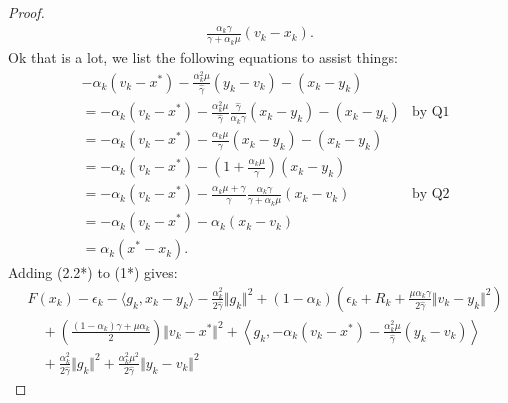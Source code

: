 \documentclass[12pt]{article}
\begin{document}
\begin{proof}
\begin{align*}
            \frac{\alpha_k \gamma}{\gamma + \alpha_k \mu}(v_k - x_k). 
        \end{align*}
        Ok that is a lot, we list the following equations to assist things: 
        \begin{align*}
            &  
            - \alpha_k(v_k - x^*) - \frac{\alpha_k^2 \mu}{\hat \gamma}(y_k - v_k) - (x_k - y_k)
            \\
            & =
            -\alpha_k(v_k - x^*) -
            \frac{\alpha_k^2\mu}{\hat \gamma}\frac{\hat \gamma}{\alpha_k \gamma}(x_k - y_k)
            - (x_k - y_k) 
            &\text{by Q1} 
            \\
            &= 
            -\alpha_k(v_k - x^*) -
            \frac{\alpha_k \mu}{\gamma}(x_k - y_k)
            - (x_k - y_k) 
            \\
            &= 
            -\alpha_k(v_k - x^*) -
            \left(
                1 + \frac{\alpha_k \mu}{\gamma}
            \right)(x_k - y_k)
            \\
            &= 
            -\alpha_k(v_k - x^*) - 
            \frac{\alpha_k \mu + \gamma}{\gamma}
            \frac{\alpha_k \gamma}{\gamma + \alpha_k \mu}(x_k - v_k)
            &\text{by Q2}
            \\
            &= 
            -\alpha_k(v_k - x^*)
            - \alpha_k(x_k - v_k)
            \\
            &= \alpha_k(x^* - x_k). 
        \tag{Q3}
        \end{align*}
        Adding (2.2*) to (1*) gives: 
        \begin{align*}
            &
            F(x_k) - \epsilon_k - \langle  g_k, x_k - y_k\rangle
            - \frac{\alpha_k^2}{2\hat \gamma}\Vert g_k\Vert^2
            + (1 - \alpha_k)
            \left(
                \epsilon_k + R_k + 
                \frac{\mu\alpha_k\gamma}{2\hat \gamma}
                \Vert v_k - y_k\Vert^2
            \right)
            \\
            &\quad 
                + 
                \left(
                \frac{(1 - \alpha_k)\gamma + \mu \alpha_k}{2} 
                \right)\Vert v_k - x^*\Vert^2
                + 
                \left\langle g_k, 
                    - \alpha_k(v_k - x^*) 
                    - \frac{\alpha_k^2\mu}{\hat \gamma}(y_k - v_k)
                \right\rangle
            \\
            & \quad 
                + \frac{\alpha_k^2}{2\hat \gamma}\Vert g_k\Vert^2
                + \frac{\alpha_k^2 \mu^2}{2\hat \gamma}\Vert y_k - v_k\Vert^2

\end{align*}
\end{proof}
\end{document}
